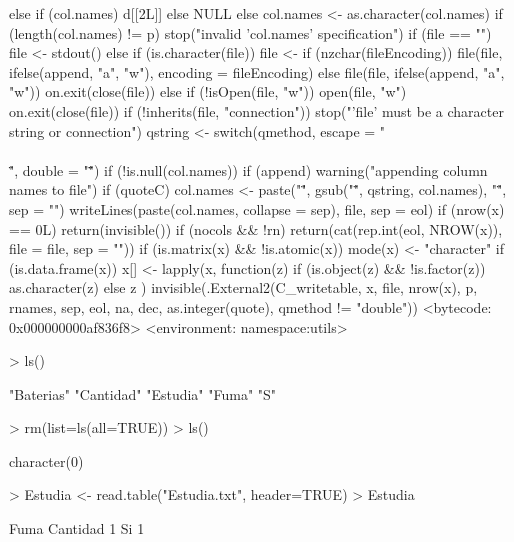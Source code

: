 \documentclass{article}
\begin{document}
\begin{Schunk}
\begin{Soutput}
{{        else if (col.names) 
            d[[2L]]
        else NULL
    }
    else {
        col.names <- as.character(col.names)
        if (length(col.names) != p) 
            stop("invalid 'col.names' specification")
    }
    if (file == "") 
        file <- stdout()
    else if (is.character(file)) {
        file <- if (nzchar(fileEncoding)) 
            file(file, ifelse(append, "a", "w"), encoding = fileEncoding)
        else file(file, ifelse(append, "a", "w"))
        on.exit(close(file))
    }
    else if (!isOpen(file, "w")) {
        open(file, "w")
        on.exit(close(file))
    }
    if (!inherits(file, "connection")) 
        stop("'file' must be a character string or connection")
    qstring <- switch(qmethod, escape = "\\\\\"", double = "\"\"")
    if (!is.null(col.names)) {
        if (append) 
            warning("appending column names to file")
        if (quoteC) 
            col.names <- paste("\"", gsub("\"", qstring, col.names), 
                "\"", sep = "")
        writeLines(paste(col.names, collapse = sep), file, sep = eol)
    }
    if (nrow(x) == 0L) 
        return(invisible())
    if (nocols && !rn) 
        return(cat(rep.int(eol, NROW(x)), file = file, sep = ""))
    if (is.matrix(x) && !is.atomic(x)) 
        mode(x) <- "character"
    if (is.data.frame(x)) {
        x[] <- lapply(x, function(z) {
            if (is.object(z) && !is.factor(z)) 
                as.character(z)
            else z
        })
    }
    invisible(.External2(C_writetable, x, file, nrow(x), p, rnames, 
        sep, eol, na, dec, as.integer(quote), qmethod != "double"))
}
<bytecode: 0x000000000af836f8>
<environment: namespace:utils>
\end{Soutput}
\begin{Sinput}
> ls()
\end{Sinput}
\begin{Soutput}
[1] "Baterias" "Cantidad" "Estudia"  "Fuma"     "S"       
\end{Soutput}
\begin{Sinput}
> rm(list=ls(all=TRUE))
> ls()
\end{Sinput}
\begin{Soutput}
character(0)
\end{Soutput}
\begin{Sinput}
> Estudia <- read.table("Estudia.txt", header=TRUE)
> Estudia
\end{Sinput}
\begin{Soutput}
   Fuma Cantidad
1    Si        1

\end{Soutput}
\end{Schunk}
\end{document}
